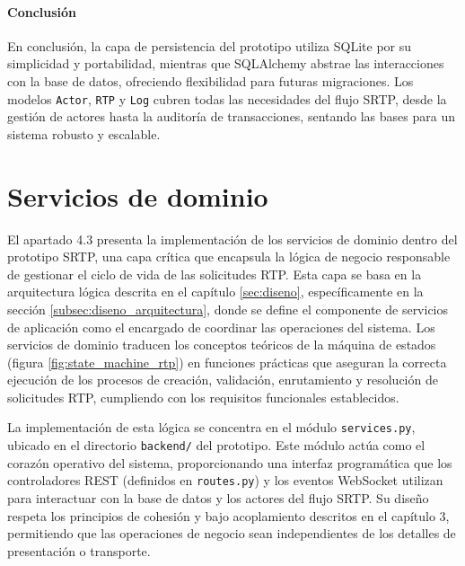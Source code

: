 \paragraph*{Conclusión}

En conclusión, la capa de persistencia del prototipo utiliza SQLite por su simplicidad y portabilidad, mientras que SQLAlchemy abstrae las interacciones con la base de datos, ofreciendo flexibilidad para futuras migraciones. Los modelos \texttt{Actor}, \texttt{RTP} y \texttt{Log} cubren todas las necesidades del flujo SRTP, desde la gestión de actores hasta la auditoría de transacciones, sentando las bases para un sistema robusto y escalable.


\section{Servicios de dominio}
\label{subsec:servicios_dominio}

El apartado 4.3 presenta la implementación de los servicios de dominio dentro del prototipo SRTP, una capa crítica que encapsula la lógica de negocio responsable de gestionar el ciclo de vida de las solicitudes RTP. Esta capa se basa en la arquitectura lógica descrita en el capítulo \ref{sec:diseno}, específicamente en la sección \ref{subsec:diseno_arquitectura}, donde se define el componente de servicios de aplicación como el encargado de coordinar las operaciones del sistema. Los servicios de dominio traducen los conceptos teóricos de la máquina de estados (figura \ref{fig:state_machine_rtp}) en funciones prácticas que aseguran la correcta ejecución de los procesos de creación, validación, enrutamiento y resolución de solicitudes RTP, cumpliendo con los requisitos funcionales establecidos.

La implementación de esta lógica se concentra en el módulo \texttt{services.py}, ubicado en el directorio \texttt{backend/} del prototipo. Este módulo actúa como el corazón operativo del sistema, proporcionando una interfaz programática que los controladores REST (definidos en \texttt{routes.py}) y los eventos WebSocket utilizan para interactuar con la base de datos y los actores del flujo SRTP. Su diseño respeta los principios de cohesión y bajo acoplamiento descritos en el capítulo 3, permitiendo que las operaciones de negocio sean independientes de los detalles de presentación o transporte.

